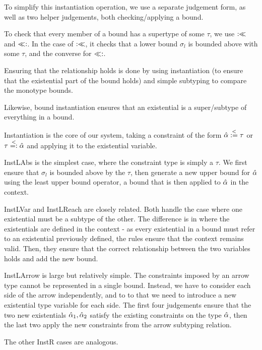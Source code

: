 \documentclass{llncs}
\begin{document}
To simplify this instantiation operation, we use a separate judgement form, as well as two helper judgements, both checking/applying a bound.

\begin{figure}

\end{figure}

To check that every member of a bound has a supertype of some $\tau$, we use $:\ll$ and $\ll:$. In the case of $:\ll$, it checks that a lower bound $\sigma_l$ is bounded above with some $\tau$, and the converse for $\ll:$.

Ensuring that the relationship holds is done by using instantiation (to ensure that the existential part of the bound holds) and simple subtyping to compare the monotype bounds.

\begin{figure}[H]

\end{figure}

Likewise, bound instantiation ensures that an existential is a super/subtype of everything in a bound.


\begin{figure}[h]

\end{figure}

Instantiation is the core of our system, taking a constraint of the form $\hat{\alpha} \overset{<}{:=} \tau$ or $\tau \overset{<}{=:}\hat{\alpha}$ and applying it to the existential variable. 

InstLAbs is the simplest case, where the constraint type is simply a $\tau$. We first ensure that $\sigma_l$ is bounded above by the $\tau$, then generate a new upper bound for $\hat{\alpha}$ using the least upper bound operator, a bound that is then applied to $\hat{\alpha}$ in the context.

InstLVar and InstLReach are closely related. Both handle the case where one existential must be a subtype of the other. The difference is in where the existentials are defined in the context - as every existential in a bound must refer to an existential previously defined, the rules ensure that the context remains valid. Then, they ensure that the correct relationship between the two variables holds and add the new bound.

InstLArrow is large but relatively simple. The constraints imposed by an arrow type cannot be represented in a single bound. Instead, we have to consider each side of the arrow independently, and to to that we need to introduce a new existential type variable for each side. The first four judgements ensure that the two new existentials $\hat{\alpha}_1,\hat{\alpha}_2$ satisfy the existing constraints on the type $\hat{\alpha}$, then the last two apply the new constraints from the arrow subtyping relation.

The other InstR cases are analogous.
\end{document}
